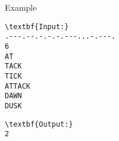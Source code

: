 Example
\begin{verbatim}
\textbf{Input:}
.---.--.-.-.-.---...-.---.
6
AT
TACK
TICK
ATTACK
DAWN
DUSK \end{verbatim}
\begin{verbatim}
\textbf{Output:}
2
\end{verbatim}